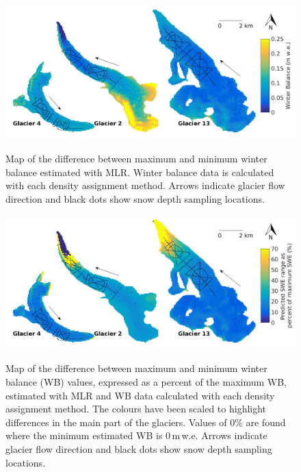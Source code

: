\documentclass{sfuthesis}
\newcommand{\topomap}{Arrows indicate glacier flow direction and black dots show snow depth sampling locations. }
\begin{document}
\begin{figure}[H]
	\centering
	\includegraphics[width =\textwidth]{MLR_SWEdifferenceMap.png}\\
	\caption{Map of the difference between maximum and minimum winter balance estimated with MLR. Winter balance data is calculated with each density assignment method. \topomap}
	\label{fig:MLR_SWEdiffMap}
\end{figure}

 \begin{figure}[H]
	\centering
	\includegraphics[width =\textwidth]{MLR_SWEdifferenceMap_percent.png}\\
	\caption{Map of the difference between maximum and minimum winter balance (WB) values, expressed as a percent of the maximum WB, estimated with MLR and WB data calculated with each density assignment method. The colours have been scaled to highlight differences in the main part of the glaciers. Values of 0\% are found where the minimum estimated WB is 0\,m\,w.e. \topomap}
	\label{fig:MLR_SWEdiffMapPercent}
\end{figure}
 
\end{document}
